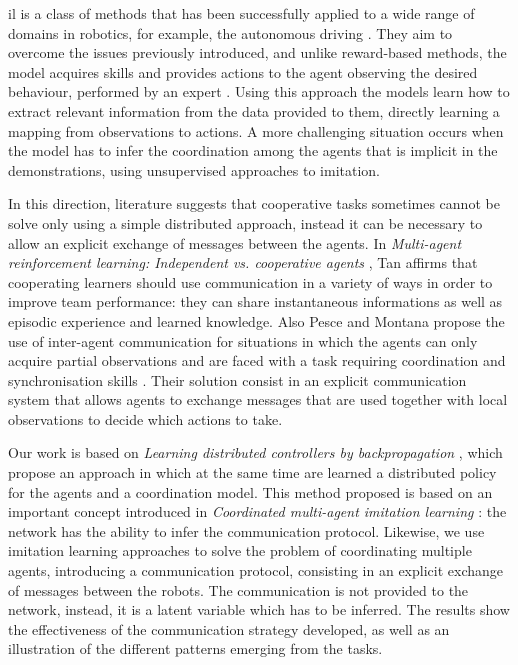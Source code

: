 \gls{il} is a class of methods that has been successfully applied to a wide range of 
domains in robotics, for example, the autonomous driving 
\cite[][]{schaal1999imitation, stepputtis2019imitation}. They aim to overcome the 
issues previously introduced, and unlike reward-based methods, the model 
acquires skills and provides actions to the agent observing the desired behaviour, 
performed by an expert \cite[][]{song2018multi, zhang2018deep, 
billard2008survey}.
Using this approach the models learn how to extract relevant information from 
the data provided to them, directly learning a mapping from observations to 
actions. 
A more challenging situation occurs when the model has to infer the coordination 
among the agents that is implicit in the demonstrations, using unsupervised 
approaches to imitation.

In this direction, literature suggests that cooperative tasks sometimes cannot be 
solve only using a simple distributed approach, instead it can be necessary to 
allow an explicit exchange of messages between the agents.
In \emph{Multi-agent reinforcement learning: Independent vs. cooperative 
agents} \cite[][]{tan1993multi}, Tan affirms that cooperating learners should use 
communication in a variety of ways in order to improve team performance: they 
can share instantaneous informations as well as episodic experience and learned 
knowledge.
Also Pesce and Montana propose the use of inter-agent communication for 
situations in which the agents can only acquire partial observations and are faced 
with a task requiring coordination and synchronisation skills 
\cite[][]{pesce2019improving}. Their solution consist in an explicit communication 
system that allows agents to exchange messages that are used together with local 
observations to decide which actions to take.

Our work is based on \emph{Learning distributed controllers by backpropagation}
\cite[][]{marcoverna2020}, which propose an approach in which at the same time 
are learned a distributed policy for the agents and a coordination model. 
This method proposed is based on an important concept introduced in 
\emph{Coordinated multi-agent imitation learning} \cite[][]{le2017coordinated}:  
the network has the ability to infer the communication protocol.
Likewise, we use imitation learning approaches to solve the problem of 
coordinating multiple agents, introducing a communication protocol, consisting 
in an explicit exchange of messages between the robots. The communication is 
not provided to the network, instead, it is a latent variable which has to be 
inferred.   
The results show the effectiveness of the communication strategy developed, as 
well as an illustration of the different patterns emerging from the tasks.
